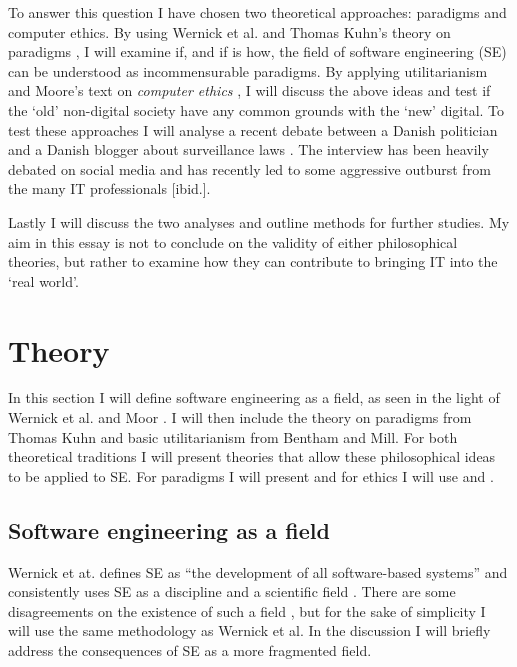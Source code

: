 \documentclass{article}
\begin{document}
To answer this question I have chosen two theoretical approaches: paradigms and computer ethics. 
By using Wernick et al. and Thomas Kuhn's theory on paradigms \citep{Wernick:2004, Holm:2014}, I will examine if, and if is how, the field of software engineering (SE) can be understood as incommensurable paradigms.
By applying utilitarianism and Moore's text on \textit{computer ethics} \citep{Moor:1985}, I will discuss the above ideas and test if the `old' non-digital society have any common grounds with the `new' digital.
To test these approaches I will analyse a recent debate between a Danish politician and a Danish blogger about surveillance laws \citep{Bramsen:2014}. The interview has been heavily debated on social media and has recently led to some aggressive outburst from the many IT professionals [ibid.].

Lastly I will discuss the two analyses and outline methods for further studies. My aim in this essay is not to conclude on the validity of either philosophical theories, but rather to examine how they can contribute to bringing IT into the `real world'.

\section{Theory}
In this section I will define software engineering as a field, as seen in the light of Wernick et al. and Moor \citep{Wernick:2004, Moor:1985}. I will then include the theory on paradigms from Thomas Kuhn and basic utilitarianism from Bentham and Mill. For both theoretical traditions I will present theories that allow these philosophical ideas to be applied to SE. For paradigms I will present \cite{Wernick:2004} and for ethics I will use \cite{Moor:1985} and \cite{Floridi:1999}.

\subsection{Software engineering as a field}
Wernick et at. defines SE as ``the development of all software-based systems'' and consistently uses SE as a discipline and a scientific field \citep[p. 235-236]{Wernick:2004}. There are some disagreements on the existence of such a field \citep{Banville:1989, Floridi:1999}, but for the sake of simplicity I will use the same methodology as Wernick et al. In the discussion I will briefly address the consequences of SE as a more fragmented field.
\end{document}
